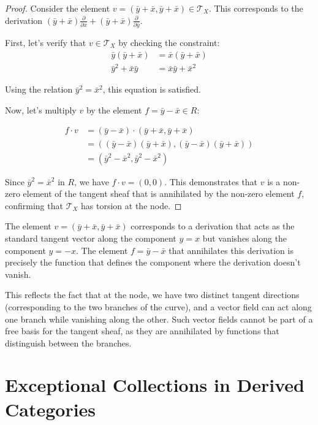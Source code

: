 \documentclass[12pt]{article}
\begin{document}
\begin{proof}
Consider the element $v = (\bar{y}+\bar{x}, \bar{y}+\bar{x}) \in \mathcal{T}_X$. This corresponds to the derivation $(\bar{y}+\bar{x})\frac{\partial}{\partial \bar{x}} + (\bar{y}+\bar{x})\frac{\partial}{\partial \bar{y}}$.

First, let's verify that $v \in \mathcal{T}_X$ by checking the constraint:
\begin{align}
\bar{y}(\bar{y}+\bar{x}) &= \bar{x}(\bar{y}+\bar{x})\\
\bar{y}^2 + \bar{x}\bar{y} &= \bar{x}\bar{y} + \bar{x}^2
\end{align}

Using the relation $\bar{y}^2 = \bar{x}^2$, this equation is satisfied.

Now, let's multiply $v$ by the element $f = \bar{y}-\bar{x} \in R$:

\begin{align}
f \cdot v &= (\bar{y}-\bar{x}) \cdot (\bar{y}+\bar{x}, \bar{y}+\bar{x})\\
&= ((\bar{y}-\bar{x})(\bar{y}+\bar{x}), (\bar{y}-\bar{x})(\bar{y}+\bar{x}))\\
&= (\bar{y}^2-\bar{x}^2, \bar{y}^2-\bar{x}^2)
\end{align}

Since $\bar{y}^2 = \bar{x}^2$ in $R$, we have $f \cdot v = (0,0)$. This demonstrates that $v$ is a non-zero element of the tangent sheaf that is annihilated by the non-zero element $f$, confirming that $\mathcal{T}_X$ has torsion at the node.
\end{proof}

\begin{remark}
The element $v = (\bar{y}+\bar{x}, \bar{y}+\bar{x})$ corresponds to a derivation that acts as the standard tangent vector along the component $y = x$ but vanishes along the component $y = -x$. The element $f = \bar{y}-\bar{x}$ that annihilates this derivation is precisely the function that defines the component where the derivation doesn't vanish.

This reflects the fact that at the node, we have two distinct tangent directions (corresponding to the two branches of the curve), and a vector field can act along one branch while vanishing along the other. Such vector fields cannot be part of a free basis for the tangent sheaf, as they are annihilated by functions that distinguish between the branches.
\end{remark}

\section{Exceptional Collections in Derived Categories}
\end{document}
